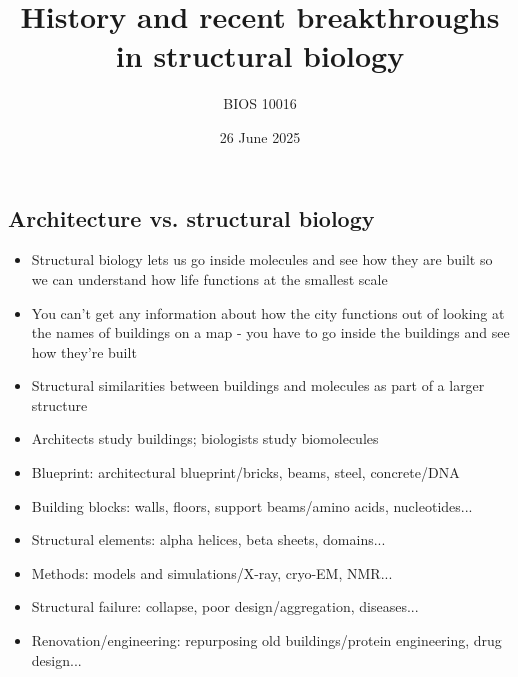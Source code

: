 \documentclass[letterpaper, 12pt]{article}
\title{History and recent breakthroughs in structural biology}
\author{BIOS 10016}
\date{26 June 2025}
\begin{document}
\maketitle

\subsection*{Architecture vs. structural biology}

\begin{itemize}
\item Structural biology lets us go inside molecules and see how they are built so we can understand how life functions at the smallest scale
\item You can't get any information about how the city functions out of looking at the names of buildings on a map - you have to go inside the buildings and see how they're built
\item Structural similarities between buildings and molecules as part of a larger structure
\item Architects study buildings; biologists study biomolecules
\item Blueprint: architectural blueprint/bricks, beams, steel, concrete/DNA
\item Building blocks: walls, floors, support beams/amino acids, nucleotides...
\item Structural elements: alpha helices, beta sheets, domains...
\item Methods: models and simulations/X-ray, cryo-EM, NMR...
\item Structural failure: collapse, poor design/aggregation, diseases...
\item Renovation/engineering: repurposing old buildings/protein engineering, drug design...
\end{itemize}
\end{document}
